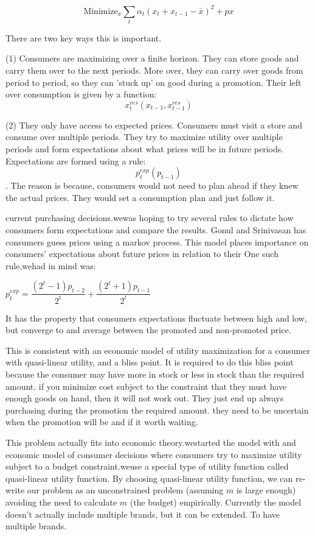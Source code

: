 \documentclass{article}
\begin{document}
$$ \text{Minimize}_{x} \sum_t \alpha_t (x_t + x_{t-1} - \bar{x})^2 + p x $$

There are two key ways this is important.

(1) Consumers are maximizing over a finite horizon. They can store goods and carry them over to the next periods. More over, they can carry over goods from period to period, so they can 'stuck up' on good during a promotion. Their left over consumption is given by a function: $$x^{res}_t(x_{t-1},x^{res}_{t-1})$$

(2) They only have access to expected prices. Consumers must visit a store and consume over multiple periods. They try to maximize utility over multiple periods and form expectations about what prices will be in future periods. Expectations are formed using a rule: $$p^{exp}_t(p_{t-1})$$. The reason is because, consumers would not need to plan ahead if they knew the actual prices. They would set a consumption plan and just follow it.


current purchasing decisions.wewas hoping to try several rules to dictate how consumers form expectations and compare the results.
Gonul and Srinivasan has consumers guess prices using a markov process. This model places importance on consumers' expectations about future prices in relation to their 
One such rule,wehad in mind was:

$p^{exp}_t = \dfrac {(2^t-1)p_{t-2}} {2^t} + \dfrac {(2^t+1)p_{t-1}} {2^t}$ 

It has the property that consumers expectations fluctuate between high and low, but converge to and average between the promoted and non-promoted price.




This is consistent with an economic model of utility maximization for a consumer with quasi-linear utility, and a bliss point. It is required to do this bliss point because the consumer may have more in stock or less in stock than the required amount. if you minimize cost subject to the constraint that they must have enough goods on hand, then it will not work out. They just end up always purchasing during the promotion the required amount. they need to be uncertain when the promotion will be and if it worth waiting.


This problem actually fits into economic theory.westarted the model with and economic model of consumer decisions where consumers try to maximize utility subject to a budget constraint.weuse a special type of utility function called quasi-linear utility function. By choosing quasi-linear utility function, we can re-write our problem as an unconstrained problem (assuming $m$ is large enough) avoiding the need to calculate $m$ (the budget) empirically. 
Currently the model doesn't actually include multiple brands, but it can be extended. To have multiple brands.
\end{document}
